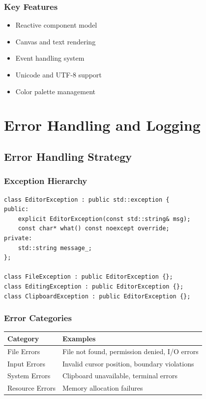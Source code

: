 \documentclass[12pt,a4paper,oneside,openany]{report}
\begin{document}
\subsection{Key Features}

\begin{itemize}
	\item Reactive component model
	\item Canvas and text rendering
	\item Event handling system
	\item Unicode and UTF-8 support
	\item Color palette management
\end{itemize}

\chapter{Error Handling and Logging}

\section{Error Handling Strategy}

\subsection{Exception Hierarchy}

\begin{lstlisting}
class EditorException : public std::exception {
public:
    explicit EditorException(const std::string& msg);
    const char* what() const noexcept override;
private:
    std::string message_;
};

class FileException : public EditorException {};
class EditingException : public EditorException {};
class ClipboardException : public EditorException {};
\end{lstlisting}

\subsection{Error Categories}

\begin{table}[H]
	\centering
	\begin{tabular}{|l|p{6cm}|}
		\hline
		\textbf{Category} & \textbf{Examples}                             \\
		\hline
		File Errors       & File not found, permission denied, I/O errors \\
		\hline
		Input Errors      & Invalid cursor position, boundary violations  \\
		\hline
		System Errors     & Clipboard unavailable, terminal errors        \\
		\hline
		Resource Errors   & Memory allocation failures                    \\
		\hline
	\end{tabular}
\end{table}
\end{document}
